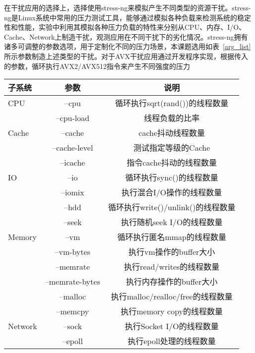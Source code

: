 在干扰应用的选择上，选择使用stress-ng来模拟产生不同类型的资源干扰。stress-ng是Linux系统中常用的压力测试工具，能够通过模拟各种负载来检测系统的稳定性和性能，实验中利用其模拟各种压力负载的特性来分别从CPU、内存、I/O、Cache、Network上制造干扰，观测应用在不同干扰下的劣化情况。stress-ng拥有诸多可调整的参数选项，用于定制化不同的压力场景，本课题选用如表~\ref{arg_list}所示参数制造上述类型的干扰。对于AVX干扰应用通过开发程序实现，根据传入的参数，循环执行AVX2/AVX512指令来产生不同强度的压力

\begin{table}
    \label{tab:arg_list}
    \footnotesize%
    \setlength{\tabcolsep}{4pt}%
    \renewcommand{\arraystretch}{1.5}%
    \centering
    \begin{tabular}{lcc}
        \hline
        子系统 & 参数 & 说明\\
        \hline
        CPU	    & --cpu	& 循环执行sqrt(rand())的线程数量\\
	            & --cpu-load & 线程负载的比率\\
        Cache	& --cache & cache抖动线程数量\\
	    & --cache-level	&测试指定等级的Cache\\
	    & --icache	&指令cache抖动的线程数量\\
        IO	    & --io	&循环执行sync()的线程数量\\
	            & --iomix	&执行混合I/O操作的线程数量\\
	            & --hdd	&循环执行write()/unlink()的线程数量\\
	            & --seek	&执行随机seek I/O的线程数量\\
        Memory	& --vm	&循环执行匿名mmap的线程数量\\
	            & --vm-bytes	&执行vm操作的buffer大小\\
	            & --memrate	&执行read/writes的线程数量\\
	            & --memrate-bytes	&执行内存操作的buffer大小\\
	            & --malloc	&执行malloc/realloc/free的线程数量\\
	            & --memcpy	&执行memory copy的线程数量\\
        Network	& --sock	&执行Socket I/O的线程数量\\
	            & --epoll	&执行epoll处理的线程数量\\
        \hline
    \end{tabular}
\end{table}

